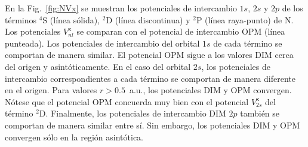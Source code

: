 En la Fig.~\ref{fig:NVx} se muestran los potenciales de intercambio 
$1s$, $2s$ y $2p$ de los términos $^4$S (línea sólida), $^2$D (línea 
discontinua) y $^2$P (línea raya-punto) de N. Los potenciales 
$V_{nl}^{\mathrm{x}}$ se comparan con el potencial de intercambio OPM 
(línea punteada). Los potenciales de intercambio del orbital $1s$ de 
cada término se comportan de manera similar. El potencial OPM sigue a 
los valores DIM cerca del origen y asintóticamente. En el caso del 
orbital $2s$, los potenciales de intercambio correspondientes a cada 
término se comportan de manera diferente en el origen. Para valores 
$r>0.5$~a.u., los potenciales DIM y OPM convergen. Nótese que el 
potencial OPM concuerda muy bien con el potencial $V_{2s}^{\mathrm{x}}$ 
del término $^2$D. Finalmente, los potenciales de intercambio DIM $2p$ 
también se comportan de manera similar entre sí. Sin embargo, los 
potenciales DIM y OPM convergen sólo en la región asintótica. 


